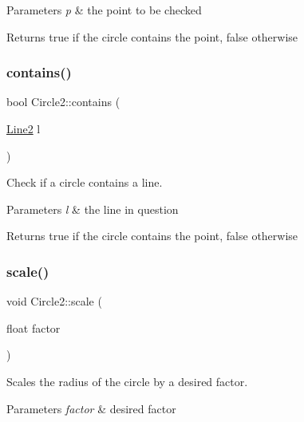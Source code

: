 \begin{DoxyParams}{Parameters}
{\em p} & the point to be checked \\
\hline
\end{DoxyParams}
\begin{DoxyReturn}{Returns}
true if the circle contains the point, false otherwise 
\end{DoxyReturn}
\mbox{\label{class_circle2_ad79e383e3e070f5884c61fc8753627c0}} 
\subsubsection{\texorpdfstring{contains()}{contains()}\hspace{0.1cm}{\footnotesize\ttfamily [2/2]}}
{\footnotesize\ttfamily bool Circle2\+::contains (\begin{DoxyParamCaption}\item[{\mbox{\hyperlink{class_line2}{Line2}}}]{l }\end{DoxyParamCaption})}



Check if a circle contains a line. 


\begin{DoxyParams}{Parameters}
{\em l} & the line in question \\
\hline
\end{DoxyParams}
\begin{DoxyReturn}{Returns}
true if the circle contains the point, false otherwise 
\end{DoxyReturn}
\mbox{\label{class_circle2_aef5dc310f0f5bc259e49b5c44dee40b9}} 
\subsubsection{\texorpdfstring{scale()}{scale()}}
{\footnotesize\ttfamily void Circle2\+::scale (\begin{DoxyParamCaption}\item[{float}]{factor }\end{DoxyParamCaption})}



Scales the radius of the circle by a desired factor. 


\begin{DoxyParams}{Parameters}
{\em factor} & desired factor \\
\hline
\end{DoxyParams}


